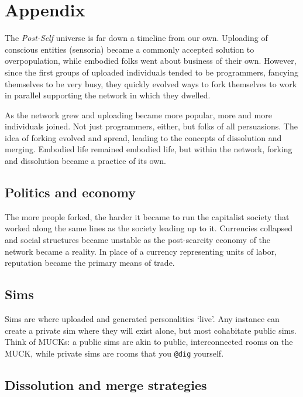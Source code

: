 \chapter{Appendix}

The \emph{Post-Self} universe is far down a timeline from our own. Uploading of conscious entities (sensoria) became a commonly accepted solution to overpopulation, while embodied folks went about business of their own. However, since the first groups of uploaded individuals tended to be programmers, fancying themselves to be very busy, they quickly evolved ways to fork themselves to work in parallel supporting the network in which they dwelled.

As the network grew and uploading became more popular, more and more individuals joined. Not just programmers, either, but folks of all persuasions. The idea of forking evolved and spread, leading to the concepts of dissolution and merging. Embodied life remained embodied life, but within the network, forking and dissolution became a practice of its own.

\hypertarget{politics-and-economy}{%
\section*{Politics and economy}\label{politics-and-economy}}

The more people forked, the harder it became to run the capitalist society that worked along the same lines as the society leading up to it. Currencies collapsed and social structures became unstable as the post-scarcity economy of the network became a reality. In place of a currency representing units of labor, reputation became the primary means of trade.

\hypertarget{sims}{%
\section*{Sims}\label{sims}}

Sims are where uploaded and generated personalities `live'. Any instance can create a private sim where they will exist alone, but most cohabitate public sims. Think of MUCKs: a public sims are akin to public, interconnected rooms on the MUCK, while private sims are rooms that you \texttt{@dig} yourself.

\hypertarget{dissolution-and-merge-strategies}{%
\section*{Dissolution and merge strategies}\label{dissolution-and-merge-strategies}}

